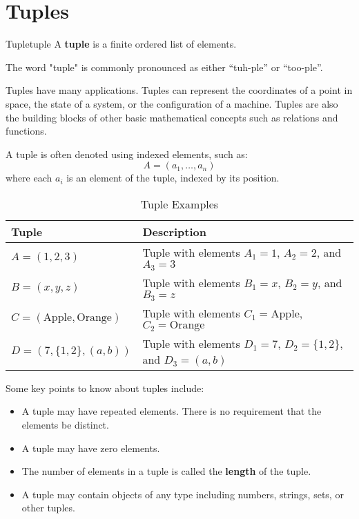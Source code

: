 \section{Tuples}
\begin{definition}{Tuple}{tuple}
  A \textbf{tuple} is a finite ordered list of elements.
\end{definition}

The word "tuple" is commonly pronounced as either “tuh-ple” or “too-ple”.

Tuples have many applications. Tuples can represent the coordinates of a point in space,
the state of a system, or the configuration of a machine. Tuples are also the building
blocks of other basic mathematical concepts such as relations and functions.

A tuple is often denoted using indexed elements, such as:
\[
  A = (a_1, \ldots, a_n)
\]
where each \( a_i \) is an element of the tuple, indexed by its position.

\begin{table}[H]
  \centering
  \begin{tabular}{ll}
    \toprule
    \textbf{Tuple} & \textbf{Description} \\
    \midrule
    \( A = (1, 2, 3) \) & Tuple with elements \( A_1 = 1 \), \( A_2 = 2 \), and \( A_3 =3 \) \\
    \( B = (x, y, z) \) & Tuple with elements \( B_1 = x \), \( B_2 = y \), and \( B_3 = z \) \\
    \( C = (\text{Apple}, \text{Orange}) \) & Tuple with elements \( C_1 = \text{Apple} \), \( C_2 = \text{Orange} \) \\
    \( D = (7, \{1, 2\}, (a, b)) \) & Tuple with elements \( D_1 = 7 \), \( D_2 = \{1, 2\} \), and \( D_3 = (a, b) \) \\
    \bottomrule
  \end{tabular}
  \caption{Tuple Examples}
\end{table}

Some key points to know about tuples include:
\begin{itemize}
  \item A tuple may have repeated elements. There is no requirement that the elements be distinct.
  \item A tuple may have zero elements.
  \item The number of elements in a tuple is called the \textbf{length} of the tuple.
  \item A tuple may contain objects of any type including numbers, strings, sets, or other tuples.
\end{itemize}

